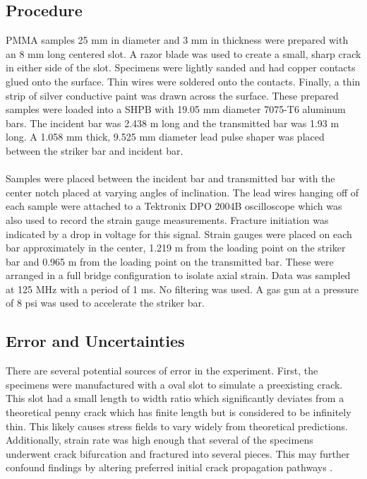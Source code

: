 \documentclass[12pt]{article}
\begin{document}
\subsection{Procedure} %
PMMA samples 25 mm in diameter and 3 mm in thickness were prepared with an 8 mm long centered slot. A razor blade was used to create a small, sharp crack in either side of the slot. Specimens were lightly sanded and had copper contacts glued onto the surface. Thin wires were soldered onto the contacts. Finally, a thin strip of silver conductive paint was drawn across the surface. These prepared samples were loaded into a SHPB with 19.05 mm diameter 7075-T6 aluminum bars. The incident bar was 2.438 m long and the transmitted bar was 1.93 m long. A 1.058 mm thick, 9.525 mm diameter lead pulse shaper was placed between the striker bar and incident bar.
\\ \\
Samples were placed between the incident bar and transmitted bar with the center notch placed at varying angles of inclination. The lead wires hanging off of each sample were attached to a Tektronix DPO 2004B oscilloscope which was also used to record the strain gauge measurements. Fracture initiation was indicated by a drop in voltage for this signal. Strain gauges were placed on each bar approximately in the center, 1.219 m from the loading point on the striker bar and 0.965 m from the loading point on the transmitted bar. These were arranged in a full bridge configuration to isolate axial strain. Data was sampled at 125 MHz with a period of 1 ms. No filtering was used. A gas gun at a pressure of 8 psi was used to accelerate the striker bar.

\subsection{Error and Uncertainties} %
There are several potential sources of error in the experiment. First, the specimens were manufactured with a oval slot to simulate a preexisting crack. This slot had a small length to width ratio which significantly deviates from a theoretical penny crack which has finite length but is considered to be infinitely thin. This likely causes stress fields to vary widely from theoretical predictions. Additionally, strain rate was high enough that several of the specimens underwent crack bifurcation and fractured into several pieces. This may further confound findings by altering preferred initial crack propagation pathways \cite{Meggiolaro}. 
\end{document}
